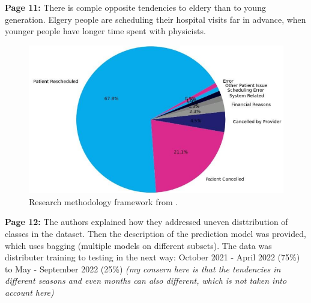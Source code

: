     \textbf{Page 11:}
    There is comple opposite tendencies to eldery than to young generation. Elgery people are scheduling their hospital visits far in advance, when younger people have longer time spent with physicists.
    \begin{figure}[H]
        \centering
        \includegraphics[width=.8\textwidth]{figures/0006_SM01US23/fig2.png}
        \caption{Research methodology framework from \cite{x147}.}
        \label{fig2:0006_SM01US23}
    \end{figure}

    \textbf{Page 12:}
    The authors explained how they addressed uneven disttribution of classes in the dataset. Then the description of the prediction model was provided, which uses bagging (multiple models on different subsets). The data was distributer training to testing in the next way: October 2021 - April 2022 (75\%) to May - September 2022 (25\%) \textit{(my consern here is that the tendencies in different seasons and even months can also different, which is not taken into account here)}

